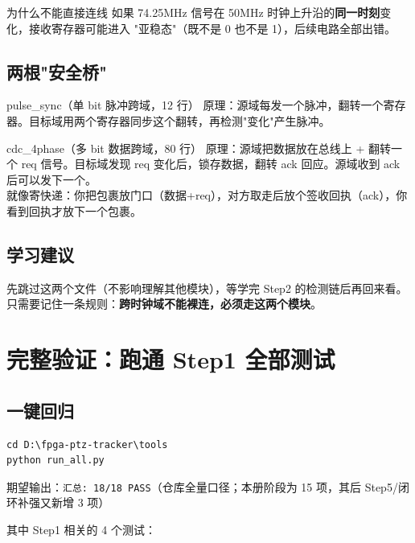 \documentclass[11pt]{ctexart}
\begin{document}
\begin{warnbox}{为什么不能直接连线}
如果 74.25MHz 信号在 50MHz 时钟上升沿的\textbf{同一时刻}变化，接收寄存器可能进入
"亚稳态"（既不是 0 也不是 1），后续电路全部出错。
\end{warnbox}

\subsection{两根"安全桥"}

\begin{keybox}{pulse\_sync（单 bit 脉冲跨域，12 行）}
原理：源域每发一个脉冲，翻转一个寄存器。目标域用两个寄存器同步这个翻转，再检测"变化"产生脉冲。
\end{keybox}

\begin{keybox}{cdc\_4phase（多 bit 数据跨域，80 行）}
原理：源域把数据放在总线上 + 翻转一个 req 信号。目标域发现 req 变化后，锁存数据，翻转 ack 回应。源域收到 ack 后可以发下一个。\\
就像寄快递：你把包裹放门口（数据+req），对方取走后放个签收回执（ack），你看到回执才放下一个包裹。
\end{keybox}

\subsection{学习建议}

先跳过这两个文件（不影响理解其他模块），等学完 Step2 的检测链后再回来看。只需要记住一条规则：\textbf{跨时钟域不能裸连，必须走这两个模块}。

\section{完整验证：跑通 Step1 全部测试}

\subsection{一键回归}

\begin{Verbatim}[frame=single,fontsize=\small]
cd D:\fpga-ptz-tracker\tools
python run_all.py
\end{Verbatim}

期望输出：\texttt{汇总: 18/18 PASS}（仓库全量口径；本册阶段为 15 项，其后
Step5/闭环补强又新增 3 项）

其中 Step1 相关的 4 个测试：
\end{document}
